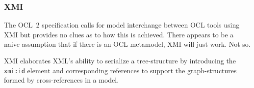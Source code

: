 \documentclass{jot}
\begin{document}


\subsubsection{XMI}

The OCL~2 specification calls for model interchange between OCL tools using XMI but provides no clues as to how this is achieved. There appears to be a naive assumption that if there is an OCL metamodel, XMI will just work. Not so.

XMI elaborates XML's ability to serialize a tree-structure by introducing the  \verb$xmi:id$ element and corresponding references to support the graph-structures formed by cross-references in a model.
\end{document}

